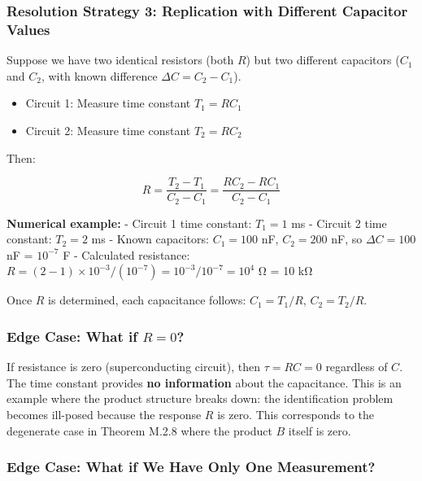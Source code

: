 \documentclass[
]{article}
\providecommand{\tightlist}{%
  \setlength{\itemsep}{0pt}\setlength{\parskip}{0pt}}
\begin{document}
\subsubsection{Resolution Strategy 3: Replication with Different
Capacitor
Values}\label{resolution-strategy-3-replication-with-different-capacitor-values}

Suppose we have two identical resistors (both \(R\)) but two different
capacitors (\(C_1\) and \(C_2\), with known difference
\(\Delta C = C_2 - C_1\)).

\begin{itemize}
\tightlist
\item
  Circuit 1: Measure time constant \(T_1 = RC_1\)
\item
  Circuit 2: Measure time constant \(T_2 = RC_2\)
\end{itemize}

Then:

\[R = \frac{T_2 - T_1}{C_2 - C_1} = \frac{RC_2 - RC_1}{C_2 - C_1}\]

\textbf{Numerical example:} - Circuit 1 time constant: \(T_1 = 1\) ms -
Circuit 2 time constant: \(T_2 = 2\) ms - Known capacitors:
\(C_1 = 100\) nF, \(C_2 = 200\) nF, so \(\Delta C = 100\) nF =
\(10^{-7}\) F - Calculated resistance:
\(R = (2 - 1) \times 10^{-3} / (10^{-7}) = 10^{-3} / 10^{-7} = 10^4\) Ω
= 10 kΩ

Once \(R\) is determined, each capacitance follows: \(C_1 = T_1 / R\),
\(C_2 = T_2 / R\).

\subsubsection{\texorpdfstring{Edge Case: What if
\(R = 0\)?}{Edge Case: What if R = 0?}}\label{edge-case-what-if-r-0}

If resistance is zero (superconducting circuit), then \(\tau = RC = 0\)
regardless of \(C\). The time constant provides \textbf{no information}
about the capacitance. This is an example where the product structure
breaks down: the identification problem becomes ill-posed because the
response \(R\) is zero. This corresponds to the degenerate case in
Theorem M.2.8 where the product \(B\) itself is zero.

\subsubsection{Edge Case: What if We Have Only One
Measurement?}\label{edge-case-what-if-we-have-only-one-measurement}
\end{document}
